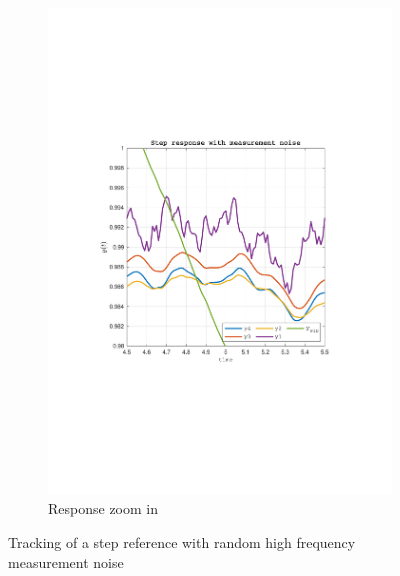 \documentclass[a4paper, 12pt]{article}
\begin{document}
\begin{figure}[h!]
\begin{subfigure}[t]{0.4\textwidth}
           \includegraphics[width=\textwidth]{Figures/fig09b.pdf}
           \caption{Response zoom in}
           \label{fig:fig09b}
       \end{subfigure}
       \caption{Tracking of a step reference with random high frequency measurement noise}
    \label{fig:fig09}
   \end{figure}
\end{document}
